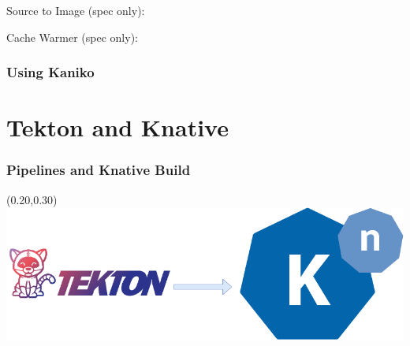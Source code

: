 \documentclass[aspectratio=169,11pt,hyperref={colorlinks=true}]{beamer}
\begin{document}
\begin{lblackrwhiteframe}
\begin{blackframe}
\begin{2columnsframe}
  {
  {\tiny Source to Image (spec only): \\}
  
  }
  {
  
  {\tiny Cache Warmer (spec only): \\}
  
  }
  \frametitle{Using Kaniko}
\end{2columnsframe}

\section{Tekton and Knative}

\begin{grayframe}
  \frametitle{Pipelines and Knative Build}
  \begin{textblock*}{0.5\paperwidth}(0.20\paperwidth,0.30\paperheight)
    \centering
    \includegraphics[width=0.6\paperwidth]{img/knative+tekton.png}
  \end{textblock*}
\end{grayframe}


\end{blackframe}
\end{lblackrwhiteframe}
\end{document}
